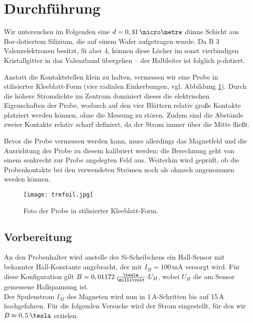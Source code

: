 
\section{Durchführung}
Wir untersuchen im Folgenden eine $d = 0,31\,\micro\metre$ dünne Schicht aus Bor-dotiertem Silizium, die auf einem Wafer aufgetragen wurde. Da \textsf{B} 3 Valenzelektronen besitzt, \textsf{Si} aber 4, können diese Löcher im sonst vierbindigen Kristallgitter in das Valenzband übergehen -- der Halbleiter ist folglich p-dotiert.

Anstatt die Kontaktstellen klein zu halten, vermessen wir eine Probe in stilisierter Kleeblatt-Form (vier radialen Einkerbungen, vgl. Abbildung \ref{fig:probe}). Durch die höhere Stromdichte im Zentrum dominiert dieses die elektrischen Eigenschaften der Probe, wodurch auf den vier \glqq Blättern\grqq{} relativ große Kontakte platziert werden können, ohne die Messung zu stören. Zudem sind die Abstände zweier Kontakte relativ scharf definiert, da der Strom immer über die Mitte fließt.

Bevor die Probe vermessen werden kann, muss allerdings das Magnetfeld und die Ausrichtung der Probe zu diesem kalibriert werden; die Berechnung geht von einem senkrecht zur Probe angelegten Feld aus. Weiterhin wird geprüft, ob die Probenkontakte bei den verwendeten Strömen noch als ohmsch angenommen werden können.

\begin{figure}[p]
\centering
\texttt{[image: trefoil.jpg]}
\caption{Foto der Probe in stilisierter Kleeblatt-Form.}
\label{fig:probe}
\end{figure}

\subsection{Vorbereitung}
An den Probenhalter wird anstelle des \textsf{Si}-Scheibchens ein Hall-Sensor mit bekannter Hall-Konstante angebracht, der mit $I_H = 100\,$mA versorgt wird. Für diese Konfiguration gilt $B = 0,01172 \,\tfrac{\tesla}{\milli\volt} \cdt U_H$, wobei $U_H$ die am Sensor gemessene Hallspannung ist.\\[1ex]
Der Spulenstrom $I_M$ des Magneten wird nun in 1\,A-Schritten bis auf 15\,A hochgefahren. Für die folgenden Versuche wird der Strom eingestellt, für den wir $B \approx 0,5 \,\tesla$ erzielen.

